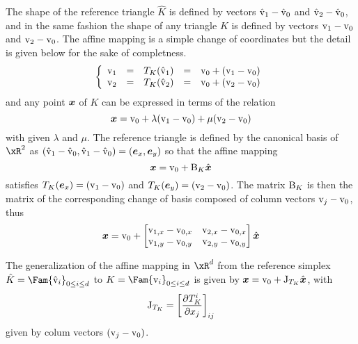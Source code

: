 \medskip
The shape of the reference triangle $\hat K$ is defined by vectors $\hat{{\mathrm v}}_1 - \hat{{\mathrm v}}_0$ and $\hat{{\mathrm v}}_2 - \hat{{\mathrm v}}_0$, and in the same fashion the shape of any triangle $K$ is defined by vectors ${\mathrm v}_1 - {\mathrm v}_0$ and ${\mathrm v}_2 - {\mathrm v}_0$.
The affine mapping is a simple change of coordinates but the detail is given below for the sake of completness.
\begin{equation*}
\left\lbrace
\begin{array}{lclcl}
{\mathrm v}_1 &=& T_K(\hat{{\mathrm v}}_1) &=& {\mathrm v}_0 + ({\mathrm v}_1 - {\mathrm v}_0)\\
{\mathrm v}_2 &=& T_K(\hat{{\mathrm v}}_2) &=& {\mathrm v}_0 + ({\mathrm v}_2 - {\mathrm v}_0)\\
\end{array}
\right.
\end{equation*}
and any point ${{\boldsymbol x}}$ of $K$ can be expressed in terms of the relation
\begin{equation*}
{{\boldsymbol x}} = {\mathrm v}_0 + \lambda ({\mathrm v}_1 - {\mathrm v}_0) + \mu ({\mathrm v}_2 - {\mathrm v}_0)
\end{equation*}
with given $\lambda$ and $\mu$.
The reference triangle is defined by the canonical basis of $\xR^2$ as $(\hat{{\mathrm v}}_1 - \hat{{\mathrm v}}_0, \hat{{\mathrm v}}_1 - \hat{{\mathrm v}}_0) = ({\boldsymbol e}_x, {\boldsymbol e}_y)$ so that the affine mapping
\begin{equation*}
{{\boldsymbol x}} = {\mathrm v}_0 + {\mathrm B}_K \hat{{{\boldsymbol x}}}
\end{equation*}
satisfies $T_K({\boldsymbol e}_x) = ({\mathrm v}_1 - {\mathrm v}_0)$ and $T_K({\boldsymbol e}_y) = ({\mathrm v}_2 - {\mathrm v}_0)$.
The matrix ${\mathrm B}_K$ is then the matrix of the corresponding change of basis composed of column vectors ${\mathrm v}_j - {\mathrm v}_0$, thus
\begin{equation*}
{{\boldsymbol x}} = {\mathrm v}_0 +
\begin{bmatrix}
{\mathrm v}_{1,x} - {\mathrm v}_{0,x} & {\mathrm v}_{2,x} - {\mathrm v}_{0,x}\\
{\mathrm v}_{1,y} - {\mathrm v}_{0,y} & {\mathrm v}_{2,y} - {\mathrm v}_{0,y}\\
\end{bmatrix}
\hat{{{\boldsymbol x}}}
\end{equation*}

\medskip
\begin{dfntn}
The generalization of the affine mapping in $\xR^d$ from the reference simplex $\hat K = \Fam{\hat\vertex_i}_{0\leq i\leq d}$ to $K = \Fam{\vertex_i}_{0\leq i\leq d}$ is given by ${{\boldsymbol x}} = {\mathrm v}_0 + {\mathrm J}_{T_K} \hat{{{\boldsymbol x}}}$,
with
\begin{equation*}
{\mathrm J}_{T_K} = \left[\frac{\partial T^i_{K}}{\partial x_j}  \right]_{ij}
\end{equation*}
given by colum vectors $({\mathrm v}_j - {\mathrm v}_0)$.
\end{dfntn}


